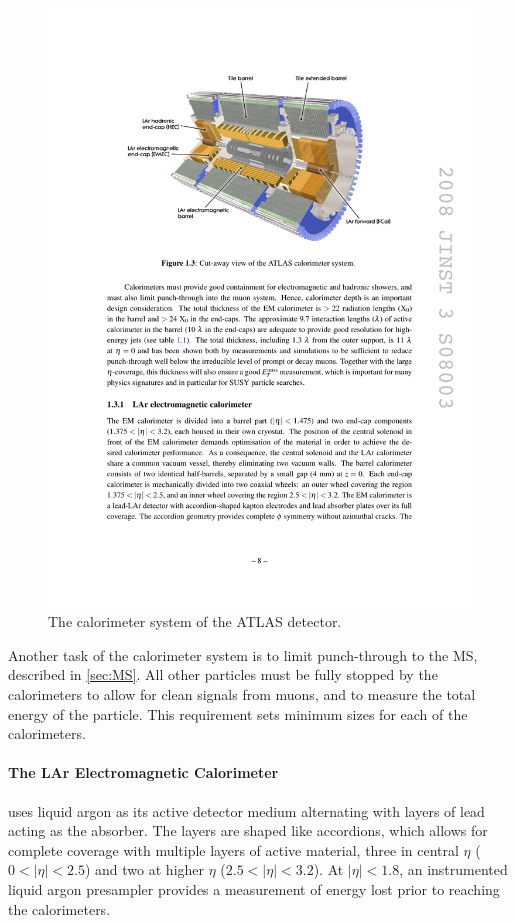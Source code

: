 \begin{centering}
\begin{figure}[bth]
\myfloatalign
\includegraphics[width=.90\linewidth]{figures/atlas/calorimeters.pdf}
\caption{The calorimeter system of the ATLAS detector.}
\label{fig:calo}
\end{figure}
\end{centering}


Another task of the calorimeter system is to limit punch-through to the \ac{MS}, described in \autoref{sec:MS}. All other particles must be fully stopped by the calorimeters to allow for clean signals from muons, and to measure the total energy of the particle. This requirement sets minimum sizes for each of the calorimeters. 

\paragraph{The LAr Electromagnetic Calorimeter} uses liquid argon as its active detector medium alternating with layers of lead acting as the absorber. The layers are shaped like accordions, which allows for complete coverage with multiple layers of active material, three in central $\eta$ ($0<|\eta|<2.5$) and two at higher $\eta$ ($2.5 < |\eta| < 3.2$). At $|\eta| < 1.8$, an instrumented liquid argon presampler provides a measurement of energy lost prior to reaching the calorimeters.

